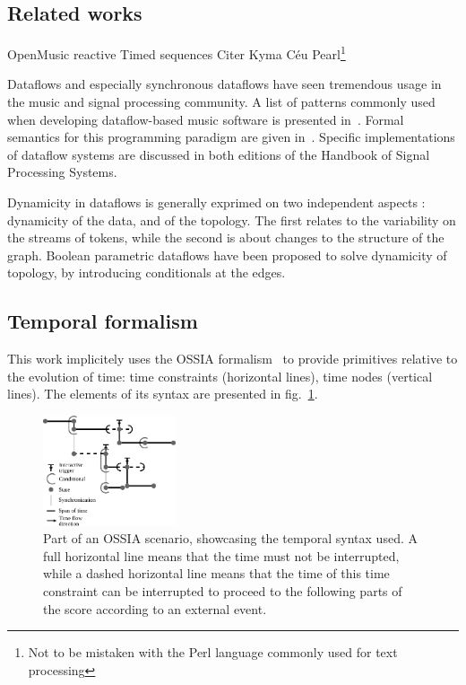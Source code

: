 \documentclass{article}
\begin{document}
\subsection{Related works}

OpenMusic reactive\cite{bresson:hal-00965747}
Timed sequences\cite{garcia:hal-01484077}
Citer Kyma\cite{scaletti1989kyma}
Céu\cite{sant2015structured}
Pearl\cite{halang2001safe}\footnote{Not to be mistaken with the Perl language commonly used for text processing}

Dataflows and especially synchronous dataflows have seen tremendous usage in the music and signal processing community. 
A list of patterns commonly used when developing dataflow-based music software is presented in~\cite{arumi2006dataflow}.
Formal semantics for this programming paradigm are given in~\cite{benveniste_data-flow_1993}.
Specific implementations of dataflow systems are discussed in both editions of the Handbook of Signal Processing Systems\cite{bhattacharyya_handbook_2013}. 

Dynamicity in dataflows is generally exprimed on two independent aspects : dynamicity of the data, and of the topology.
The first relates to the variability on the streams of tokens, while the second is about changes to the structure of the graph. 
Boolean parametric dataflows\cite{bempelis2015boolean} have been proposed to solve dynamicity of topology, by introducing conditionals at the edges.

\subsection{Temporal formalism}
This work implicitely uses the OSSIA formalism~\cite{celerier2015ossia} to provide primitives relative to the evolution of time: time constraints (horizontal lines), time nodes (vertical lines). 
The elements of its syntax are presented in fig.~\ref{fig.iscore-example}.
    
\begin{figure}[h]
  \centering
  \includegraphics[width=0.35\textwidth]{images/iscore-example.eps}
  \caption{Part of an OSSIA scenario, showcasing the temporal syntax used. 
    A full horizontal line means that the time must not be interrupted, 
    while a dashed horizontal line means that the time of this time constraint can be interrupted to proceed 
  to the following parts of the score according to an external event.}
  \label{fig.iscore-example}
\end{figure}
    
\end{document}
